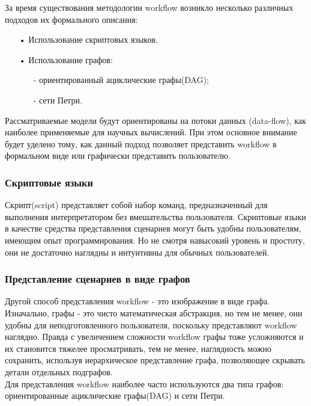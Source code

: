 \documentclass[a4paper,14pt]{article}
\begin{document}
За время существования методологии workflow возникло несколько различных подходов их формального описания:
\begin{enumerate}
\item[•] Использование скриптовых языков.
\item[•] Использование графов:
	\begin{enumerate}
		\item[-] ориентированный ациклические графы(DAG);
		\item[-] сети Петри.
	\end{enumerate}
\end{enumerate}
Рассматриваемые модели будут ориентированы на потоки данных (data-flow), как наиболее применяемые для научных вычислений. При этом основное внимание будет уделено тому, как данный подход позволяет представить workflow в формальном виде или графически представить пользователю.


\subsubsection{Скриптовые языки}
Скрипт(script) представляет собой набор команд, предназначенный для выполнения интерпретатором без вмешательства пользователя. 
 Скриптовые языки в качестве средства представления сценариев могут быть удобны пользователям, имеющим опыт программирования. Но не смотря навысокий уровень и простоту, они не достаточно наглядны и интуитивны для обычных пользователей.
\subsubsection{Представление сценариев в виде графов}
Другой способ представления workflow  - это изображение в виде графа. Изначально, графы - это чисто математическая абстракция, но тем не менее, они удобны для неподготовленного пользователя, поскольку представляют workflow наглядно.
Правда с увеличением сложности workflow графы тоже усложняются и их становится тяжелее просматривать, тем не менее, наглядность можно сохранить, используя иерархическое представление графа, позволяющее скрывать детали отдельных подграфов.\\
Для представления workflow наиболее часто используются два типа графов:
ориентированные ациклические графы(DAG) и сети Петри.
\end{document}
